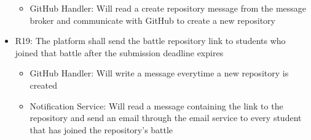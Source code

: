 \begin{itemize}
\begin{itemize}
\item GitHub Handler: Will read a create repository message from the message broker and communicate with GitHub to create a new repository
\end{itemize}
\item R19: The platform shall send the battle repository link to students who joined that battle after the submission deadline expires
\begin{itemize}
\item GitHub Handler: Will write a message everytime a new repository is created
\item Notification Service: Will read a message containing the link to the repository and send an email through the email service to every student that has joined the repository's battle
\end{itemize}
\end{itemize}